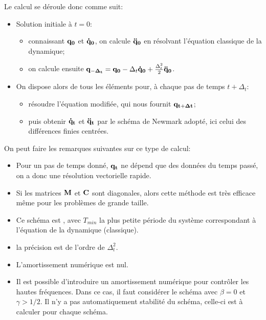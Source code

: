 \bigskip
Le calcul se déroule donc comme suit:
\begin{itemize}
   \item Solution initiale à $t=0$:
	\begin{itemize}
	\item connaissant $\mathbf{q_0}$ et $\mathbf{\dot q_0}$, on calcule $\mathbf{\ddot q_0}$ en résolvant
	l'équation \og classique\fg{} de la dynamique;
	\item on calcule ensuite $\mathbf{q_{-\Delta_t}} = \mathbf{q_0} -\Delta_t \mathbf{\dot q_0} + \frac{\Delta_t^2}2
	\mathbf{\ddot q_0}$.
	\end{itemize}
   \item On dispose alors de tous les éléments pour, à chaque pas de temps
	$t+\Delta_t$:
	\begin{itemize}
	\item résoudre l'équation modifiée, qui nous fournit $\mathbf{q_{t+\Delta t}}$;
	\item puis obtenir $\mathbf{\dot q_t}$ et $\mathbf{\ddot q_t}$ par le schéma de Newmark adopté,
	ici celui des différences finies centrées.
	\end{itemize}
\end{itemize}

\bigskip
On peut faire les remarques suivantes sur ce type de calcul:
\begin{itemize}
   \item Pour un pas de temps donné, $\mathbf{q_t}$ ne dépend que des données du temps passé,
	on a donc une résolution vectorielle rapide.
   \item Si les matrices $\mathbf{M}$ et $\mathbf{C}$ sont diagonales, alors cette méthode est très efficace
	même pour les problèmes de grande taille.
   \item Ce schéma est ,
	avec $T_{min}$ la plus petite période du système correspondant à l'équation
	de la dynamique (classique).
   \item la précision est de l'ordre de $\Delta_t^2$.
   \item L'amortissement numérique est nul.
   \item Il est possible d'introduire un amortissement numérique pour contrôler les hautes
	fréquences. Dans ce cas, il faut considérer le schéma avec $\beta=0$ et $\gamma>1/2$.
	Il n'y a pas automatiquement stabilité du schéma, celle-ci est à calculer pour chaque
	schéma.
\end{itemize}



